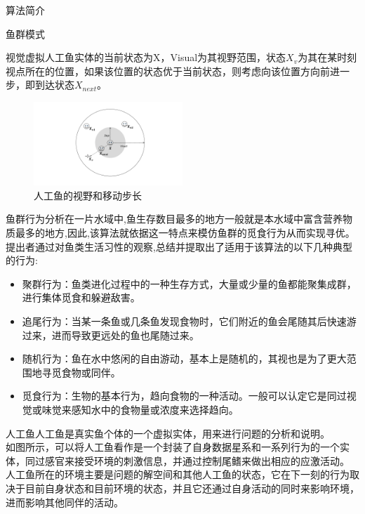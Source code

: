 \documentclass[UTF8]{ctexart}
\begin{document}
\begin{section}
{算法简介}
\begin{subsection}
{鱼群模式}
\begin{subsubsection}
{视觉}虚拟人工鱼实体的当前状态为X，Visual为其视野范围，状态$X_v$为其在某时刻视点所在的位置，如果该位置的状态优于当前状态，则考虑向该位置方向前进一步，即到达状态$X_{next}。$
\begin{figure}[htbp]
	\centering
	\includegraphics[width=0.5\textwidth]{../../pic/fish1.pdf}
	\caption{人工鱼的视野和移动步长}
\end{figure}
\end{subsubsection}
\begin{subsubsection}
{鱼群行为分析}在一片水域中,鱼生存数目最多的地方一般就是本水域中富含营养物质最多的地方,因此,该算法就依据这一特点来模仿鱼群的觅食行为从而实现寻优。提出者通过对鱼类生活习性的观察,总结并提取出了适用于该算法的以下几种典型的行为:
\begin{itemize}
	\item{聚群行为：鱼类进化过程中的一种生存方式，大量或少量的鱼都能聚集成群，进行集体觅食和躲避敌害。}
	\item{追尾行为：当某一条鱼或几条鱼发现食物时，它们附近的鱼会尾随其后快速游过来，进而导致更远处的鱼也尾随过来。}
	\item{随机行为：鱼在水中悠闲的自由游动，基本上是随机的，其视也是为了更大范围地寻觅食物或同伴。}
	\item{觅食行为：生物的基本行为，趋向食物的一种活动。一般可以认定它是同过视觉或味觉来感知水中的食物量或浓度来选择趋向。}
\end{itemize}
\end{subsubsection}
\begin{subsubsection}
{人工鱼}人工鱼是真实鱼个体的一个虚拟实体，用来进行问题的分析和说明。\\ \indent 如图所示，可以将人工鱼看作是一个封装了自身数据星系和一系列行为的一个实体，同过感官来接受环境的刺激信息，并通过控制尾鳍来做出相应的应激活动。\\ \indent 人工鱼所在的环境主要是问题的解空间和其他人工鱼的状态，它在下一刻的行为取决于目前自身状态和目前环境的状态，并且它还通过自身活动的同时来影响环境，进而影响其他同伴的活动。

\end{subsubsection}
\end{subsection}
\end{section}
\end{document}
